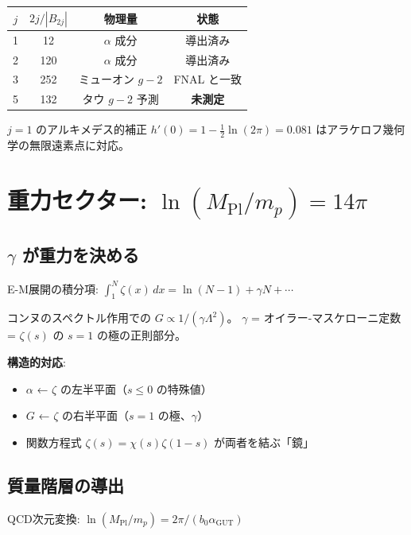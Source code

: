 \documentclass[11pt,a4paper]{article}
\begin{document}
\begin{center}
\begin{tabular}{cccc}
\toprule
$j$ & $2j/|B_{2j}|$ & 物理量 & 状態 \\
\midrule
1 & 12 & $\alpha$ 成分 & 導出済み \\
2 & 120 & $\alpha$ 成分 & 導出済み \\
3 & 252 & ミューオン $g-2$ & FNAL と一致 \\
5 & 132 & タウ $g-2$ 予測 & \textbf{未測定} \\
\bottomrule
\end{tabular}
\end{center}

$j=1$ のアルキメデス的補正 $h'(0) = 1 - \frac{1}{2}\ln(2\pi) = 0.081$
はアラケロフ幾何学の無限遠素点に対応。

\section{重力セクター: $\ln(M_{\mathrm{Pl}}/m_p) = 14\pi$}

\subsection{$\gamma$ が重力を決める}

E-M展開の積分項: $\int_1^N\zeta(x)\,dx = \ln(N-1) + \gamma N + \cdots$

コンヌのスペクトル作用での $G \propto 1/(\gamma \Lambda^2)$。
$\gamma$ = オイラー-マスケローニ定数 = $\zeta(s)$ の $s=1$ の極の正則部分。

\textbf{構造的対応}:
\begin{itemize}
\item $\alpha$ ← $\zeta$ の左半平面（$s \leq 0$ の特殊値）
\item $G$ ← $\zeta$ の右半平面（$s = 1$ の極、$\gamma$）
\item 関数方程式 $\zeta(s) = \chi(s)\zeta(1-s)$ が両者を結ぶ「鏡」
\end{itemize}

\subsection{質量階層の導出}

QCD次元変換: $\ln(M_{\mathrm{Pl}}/m_p) = 2\pi/(b_0 \alpha_{\mathrm{GUT}})$
\end{document}
